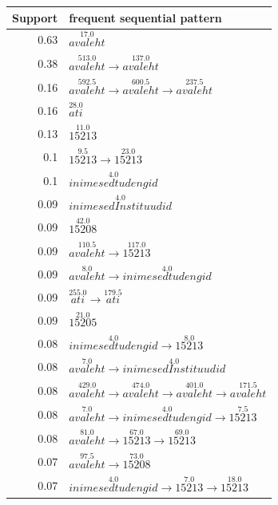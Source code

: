 \documentclass[12pt, english,a4paper]{article}
\begin{document}
\begin{figure}[H]
  \centering
\begin{tabular}{ r | l }
Support & frequent sequential pattern \\ \hline
0.63 & $ \overset{17.0}{avaleht} $ \\ \hline
0.38 & $ \overset{513.0}{avaleht} \rightarrow \overset{137.0}{avaleht} $ \\ \hline
0.16 & $ \overset{592.5}{avaleht} \rightarrow \overset{600.5}{avaleht} \rightarrow \overset{237.5}{avaleht} $ \\ \hline
0.16 & $ \overset{28.0}{ati} $ \\ \hline
0.13 & $ \overset{11.0}{15213} $ \\ \hline
0.1 & $ \overset{9.5}{15213} \rightarrow \overset{23.0}{15213} $ \\ \hline
0.1 & $ \overset{4.0}{inimesedtudengid} $ \\ \hline
0.09 & $ \overset{4.0}{inimesedInstituudid} $ \\ \hline
0.09 & $ \overset{42.0}{15208} $ \\ \hline
0.09 & $ \overset{110.5}{avaleht} \rightarrow \overset{117.0}{15213} $ \\ \hline
0.09 & $ \overset{8.0}{avaleht} \rightarrow \overset{4.0}{inimesedtudengid} $ \\ \hline
0.09 & $ \overset{255.0}{ati} \rightarrow \overset{179.5}{ati} $ \\ \hline
0.09 & $ \overset{21.0}{15205} $ \\ \hline
0.08 & $ \overset{4.0}{inimesedtudengid} \rightarrow \overset{8.0}{15213} $ \\ \hline
0.08 & $ \overset{7.0}{avaleht} \rightarrow \overset{4.0}{inimesedInstituudid} $ \\ \hline
0.08 & $ \overset{429.0}{avaleht} \rightarrow \overset{474.0}{avaleht} \rightarrow \overset{401.0}{avaleht} \rightarrow \overset{171.5}{avaleht} $ \\ \hline
0.08 & $ \overset{7.0}{avaleht} \rightarrow \overset{4.0}{inimesedtudengid} \rightarrow \overset{7.5}{15213} $ \\ \hline
0.08 & $ \overset{81.0}{avaleht} \rightarrow \overset{67.0}{15213} \rightarrow \overset{69.0}{15213} $ \\ \hline
0.07 & $ \overset{97.5}{avaleht} \rightarrow \overset{73.0}{15208} $ \\ \hline
0.07 & $ \overset{4.0}{inimesedtudengid} \rightarrow \overset{7.0}{15213} \rightarrow \overset{18.0}{15213} $ \\ \hline

\end{tabular}
\end{figure}
\end{document}
